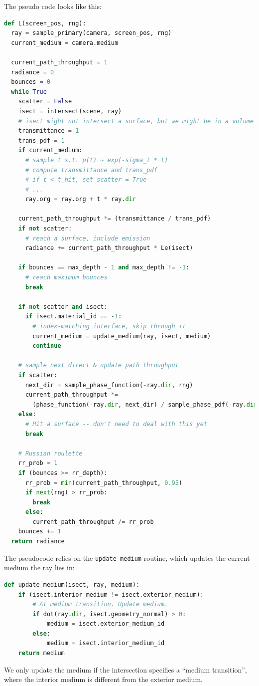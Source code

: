 The pseudo code looks like this:
\begin{lstlisting}[language=python]
def L(screen_pos, rng):
  ray = sample_primary(camera, screen_pos, rng)
  current_medium = camera.medium

  current_path_throughput = 1
  radiance = 0
  bounces = 0
  while True
    scatter = False
    isect = intersect(scene, ray)
    # isect might not intersect a surface, but we might be in a volume
    transmittance = 1
    trans_pdf = 1
    if current_medium:
      # sample t s.t. p(t) ~ exp(-sigma_t * t)
      # compute transmittance and trans_pdf
      # if t < t_hit, set scatter = True
      # ...
      ray.org = ray.org + t * ray.dir
    
    current_path_throughput *= (transmittance / trans_pdf)
    if not scatter:
      # reach a surface, include emission
      radiance += current_path_throughput * Le(isect)

    if bounces == max_depth - 1 and max_depth != -1:
      # reach maximum bounces
      break

    if not scatter and isect:
      if isect.material_id == -1:
        # index-matching interface, skip through it
        current_medium = update_medium(ray, isect, medium)
        continue

    # sample next direct & update path throughput
    if scatter:
      next_dir = sample_phase_function(-ray.dir, rng)
      current_path_throughput *=
        (phase_function(-ray.dir, next_dir) / sample_phase_pdf(-ray.dir, next_dir)) * sigma_s
    else:
      # Hit a surface -- don't need to deal with this yet
      break
    
    # Russian roulette
    rr_prob = 1
    if (bounces >= rr_depth):
      rr_prob = min(current_path_throughput, 0.95)
      if next(rng) > rr_prob:
        break
      else:
        current_path_throughput /= rr_prob
    bounces += 1
  return radiance
\end{lstlisting}

The pseudocode relies on the \lstinline{update_medium} routine, which updates the current medium the ray lies in:
\begin{lstlisting}[language=python]
def update_medium(isect, ray, medium):
    if (isect.interior_medium != isect.exterior_medium):
        # At medium transition. Update medium.
        if dot(ray.dir, isect.geometry_normal) > 0:
            medium = isect.exterior_medium_id
        else:
            medium = isect.interior_medium_id
    return medium
\end{lstlisting}
We only update the medium if the intersection specifies a ``medium transition'', where the interior medium
is different from the exterior medium.

